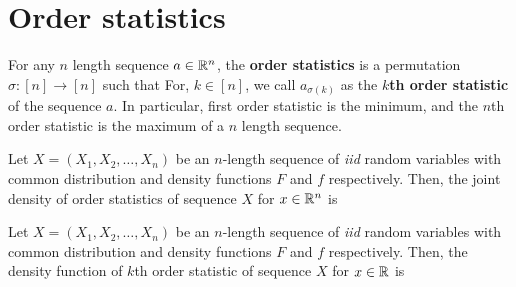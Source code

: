 \documentclass[a4paper,10pt,english]{article}
\begin{document}
\section{Order statistics}
For any $n$ length sequence $a \in \mathbb{R}^n$, the \textbf{order statistics} is a permutation $\sigma: [n] \to [n]$ such that 
For, $k \in [n]$, we call $a_{\sigma(k)}$ as the \textbf{$k$th order statistic} of the sequence $a$. 
In particular, first order statistic is the minimum, and the $n$th order statistic is the maximum of a $n$ length sequence. 
\begin{lem}
Let $X = (X_1, X_2, \dots, X_n)$ be an $n$-length sequence of \textit{iid} random variables with common distribution and density functions $F$ and $f$ respectively. 
Then, the joint density of order statistics of sequence $X$ for $x \in \mathbb{R}^n$ is
\end{lem}

\begin{lem}
Let $X = (X_1, X_2, \dots, X_n)$ be an $n$-length sequence of \textit{iid} random variables with common distribution and density functions $F$ and $f$ respectively.   
Then, the density function of $k$th order statistic of sequence $X$ for $x \in \mathbb{R}$ is
\end{lem}
\end{document}
